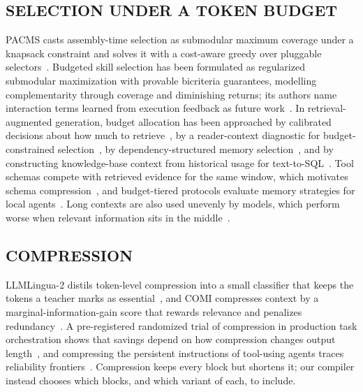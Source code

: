 \subsection{SELECTION UNDER A TOKEN BUDGET}
PACMS casts assembly-time selection as submodular maximum coverage under a knapsack constraint and solves it with a
cost-aware greedy over pluggable selectors~\cite{pacms2026}. Budgeted skill selection has been formulated as regularized
submodular maximization with provable bicriteria guarantees, modelling complementarity through coverage and
diminishing returns; its authors name interaction terms learned from execution feedback as future
work~\cite{skillselect2026}. In retrieval-augmented generation, budget allocation has been approached by calibrated
decisions about how much to retrieve~\cite{knowbefore2026}, by a reader-context diagnostic for budget-constrained
selection~\cite{recallnotenough2026}, by dependency-structured memory selection~\cite{contextweaver2026}, and by
constructing knowledge-base context from historical usage for text-to-SQL~\cite{beyondharness2026}. Tool schemas compete
with retrieved evidence for the same window, which motivates schema compression~\cite{toolschema2026}, and budget-tiered
protocols evaluate memory strategies for local agents~\cite{budgetbench2026}. Long contexts are also used unevenly by
models, which perform worse when relevant information sits in the middle~\cite{lostmiddle2024}.

\subsection{COMPRESSION}
LLMLingua-2 distils token-level compression into a small classifier that keeps the tokens a teacher marks as
essential~\cite{llmlingua2_2024}, and COMI compresses context by a marginal-information-gain score that rewards relevance
and penalizes redundancy~\cite{comi2026}. A pre-registered randomized trial of compression in production task orchestration
shows that savings depend on how compression changes output length~\cite{compressiontrial2026}, and compressing the
persistent instructions of tool-using agents traces reliability frontiers~\cite{controlcompression2026}. Compression keeps
every block but shortens it; our compiler instead chooses which blocks, and which variant of each, to include.


